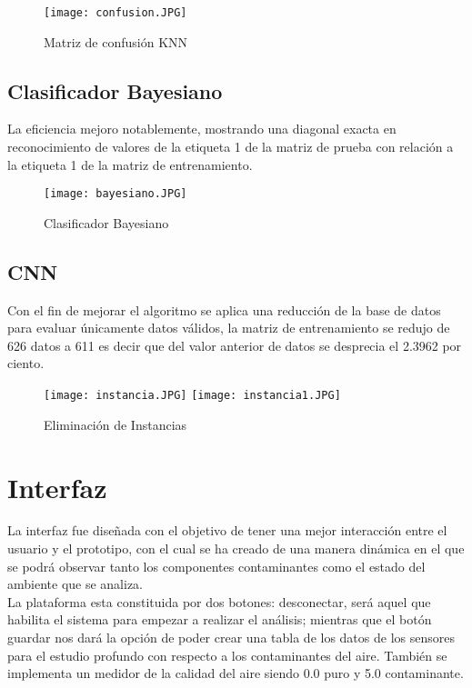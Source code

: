 \documentclass[10pt,a4paper]{article}
\begin{document}
\begin{figure}[H]
\centering
\texttt{[image: confusion.JPG]}
 \caption{Matriz de confusión KNN} 
\end{figure}

\subsection{Clasificador Bayesiano}

La eficiencia mejoro notablemente, mostrando una diagonal exacta en reconocimiento de valores de la etiqueta 1 de la matriz de prueba con relación a la etiqueta 1 de la matriz de entrenamiento. 

\begin{figure}[H]
\centering
\texttt{[image: bayesiano.JPG]}
 \caption{Clasificador Bayesiano} 
\end{figure}


\subsection{CNN}

Con el fin de mejorar el algoritmo se aplica una reducción de la base de datos para evaluar únicamente datos válidos, la matriz de entrenamiento se redujo de 626 datos a 611 es decir que del valor anterior de datos se desprecia el 2.3962 por ciento. 

\begin{figure}[H]
\centering
\texttt{[image: instancia.JPG]}
\texttt{[image: instancia1.JPG]} 
\caption{Eliminación de Instancias} 
\end{figure}




\section{Interfaz}

La interfaz fue diseñada con el objetivo de tener una mejor interacción entre el usuario y el prototipo, con el cual se ha creado de una manera dinámica en el que se podrá observar tanto los componentes contaminantes como el estado del ambiente que se analiza.\\

La plataforma esta constituida por dos botones: desconectar, será aquel que habilita el sistema para empezar a realizar el análisis; mientras que el botón guardar nos dará la opción de poder crear una tabla de los datos de los sensores para el estudio profundo con respecto a los contaminantes del aire. También se implementa un medidor de la calidad del aire siendo 0.0 puro y 5.0 contaminante.
\end{document}
